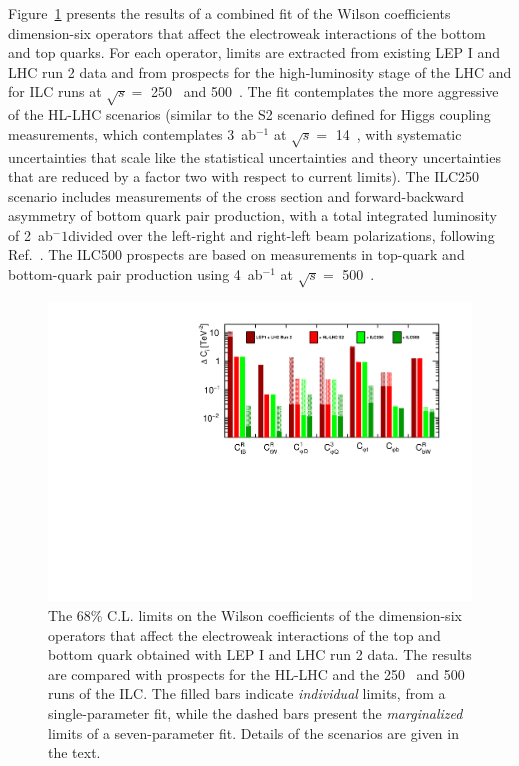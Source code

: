 Figure~\ref{fig:top_bottom_ew_fit} presents the results of a combined fit of the Wilson coefficients
dimension-six operators that affect the electroweak interactions of the bottom and top quarks. 
For each operator, limits are extracted from existing LEP I and LHC run 2 data and from prospects
for the high-luminosity stage of the LHC and for ILC runs at $\sqrt{s}=$ 250~\GeV{} and 500~\GeV.
The fit contemplates the more aggressive of the HL-LHC scenarios (similar to the S2 scenario
defined for Higgs coupling measurements, which contemplates 3~ab$^{-1}${} 
at $\sqrt{s}=$ 14~\TeV, with systematic uncertainties that scale like the statistical 
uncertainties and theory uncertainties that are reduced by a factor two with respect to 
current limits). The ILC250 scenario includes measurements of the cross section and 
forward-backward asymmetry of bottom quark pair production, with a total integrated luminosity
of 2~ab$^-1$divided over the left-right and right-left beam polarizations, following Ref.~\cite{}.
The ILC500 prospects are based on measurements in top-quark and bottom-quark pair production
using 4~ab$^{-1}${} at $\sqrt{s}=$ 500~\GeV{}.

\begin{figure}[tb]
 \begin{center}
 \includegraphics[width=0.8\hsize]{chapters/figures/manhattan_plot_bottom_top.pdf}
\caption{The 68\% C.L. limits on the Wilson coefficients of the dimension-six operators that 
affect the electroweak interactions of the top and bottom quark obtained with LEP I and LHC 
run 2 data. The results are compared with prospects for the HL-LHC and the 250~\GeV{} and
500~\GeV{} runs of the ILC. The filled bars indicate {\em individual} limits, from a 
single-parameter fit, while the dashed bars present the {\em marginalized} limits of
a seven-parameter fit. Details of the scenarios are given in the text.
\label{fig:top_bottom_ew_fit}}
 \end{center}
 \vspace{-0.7cm}
 \end{figure}

